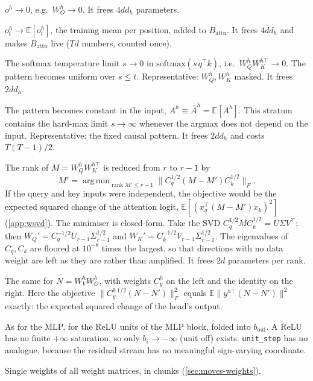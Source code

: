 \documentclass[11pt,a4paper]{article}
\theoremstyle{definition}
\newcommand{\E}{\mathbb{E}}
\DeclareMathOperator*{\argmin}{arg\,min}
\DeclareMathOperator{\rank}{rank}
\newcommand{\code}[1]{\texttt{#1}}
\begin{document}
\begin{description}[style=nextline, leftmargin=0.6cm, font=\normalfont\ttfamily]
\item[head\_off] $o^h\to0$, e.g.\ $W_O^h\to0$. It frees $4dd_h$ parameters.
\item[head\_mean] $o^h_t\to\E[o^h_t]$, the training mean per position, added to
$B_{\mathrm{attn}}$. It frees $4dd_h$ and makes $B_{\mathrm{attn}}$ live ($Td$
numbers, counted once).
\item[attn\_uniform] The softmax temperature limit $s\to0$ in
$\mathrm{softmax}(s\,q^{\top}k)$, i.e.\ $W^h_QW^{h\top}_K\to0$. The pattern becomes
uniform over $s\le t$. Representative: $W^h_Q,W^h_K$ masked. It frees $2dd_h$.
\item[attn\_fixed] The pattern becomes constant in the input,
$A^h\equiv\bar A^h=\E[A^h]$. This stratum contains the hard-max limit $s\to\infty$
whenever the argmax does not depend on the input. Representative: the fixed causal
pattern. It frees $2dd_h$ and costs $T(T-1)/2$.
\item[qk\_rank] The rank of $M=W^h_QW^{h\top}_K$ is reduced from $r$ to $r-1$ by
\begin{equation}
M'=\argmin_{\rank M'\le r-1}\big\|C_q^{1/2}(M-M')C_k^{1/2}\big\|_F .
\label{eq:wsvd}
\end{equation}
If the query and key inputs were independent, the objective would be the expected
squared change of the attention logit, $\E[(x_q^{\top}(M-M')x_k)^2]$
(\cref{app:wsvd}). The minimiser is closed-form. Take the SVD
$C_q^{1/2}MC_k^{1/2}=U\Sigma V^{\top}$; then
$W_Q'=C_q^{-1/2}U_{r-1}\Sigma_{r-1}^{1/2}$ and
$W_K'=C_k^{-1/2}V_{r-1}\Sigma_{r-1}^{1/2}$. The eigenvalues of $C_q,C_k$ are floored at
$10^{-8}$ times the largest, so that directions with no data weight are left as they
are rather than amplified. It frees $2d$ parameters per rank.
\item[ov\_rank] The same for $N=W^h_VW^h_O$, with weights $C^h_y$ on the left and the
identity on the right. Here the objective $\|C_y^{h\,1/2}(N-N')\|_F^2$ equals
$\E\|y^{h\top}(N-N')\|^2$ exactly: the expected squared change of the head's output.
\item[unit\_sat, unit\_mean, unit\_merge] As for the MLP, for the ReLU units of the
MLP block, folded into $b_{\mathrm{out}}$. A ReLU has no finite $+\infty$ saturation,
so only $b_i\to-\infty$ (unit off) exists. \code{unit\_step} has no analogue, because
the residual stream has no meaningful sign-varying coordinate.
\item[zero] Single weights of all weight matrices, in chunks
(\cref{sec:moves-weights}).
\end{description}
\end{document}
